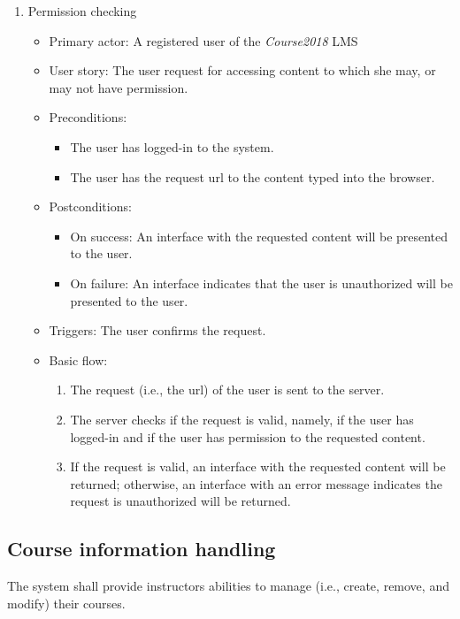 \begin{enumerate}
\item Permission checking
\begin{itemize}
\item Primary actor: 
    A registered user of the \emph{Course2018} LMS
\item User story:
    The user request for accessing content to which she may, or may not have
    permission.
\item Preconditions:
    \begin{itemize}
        \item The user has logged-in to the system.
        \item The user has the request url to the content typed into the
            browser.
    \end{itemize}
\item Postconditions:
    \begin{itemize}
        \item On success: An interface with the requested content will be presented
            to the user.
        \item On failure: An interface indicates that the user is unauthorized will
            be presented to the user.
    \end{itemize}
\item Triggers: The user confirms the request.
\item Basic flow:
    \begin{enumerate}
        \item The request (i.e., the url) of the user is sent to the server.
        \item The server checks if the request is valid, namely, if the user
            has logged-in and if the user has permission to the requested
            content.
        \item If the request is valid, an interface with the requested content will
            be returned; otherwise, an interface with an error message indicates
            the request is unauthorized will be returned.
    \end{enumerate}
\end{itemize}

\end{enumerate}


\subsection{Course information handling}
The system shall provide instructors abilities to manage (i.e., create, remove,
and modify) their courses.
